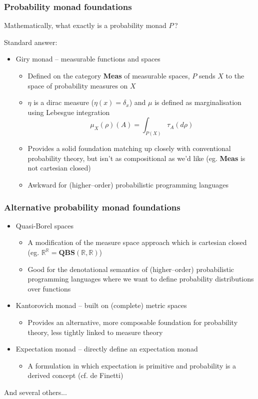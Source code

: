 \documentclass[mathserif,handout]{beamer}
\newcommand{\reals}{\mathbb{R}}
\begin{document}
\begin{frame}
  \frametitle{Probability monad foundations}
  Mathematically, what \alert{exactly} is a probability monad $P$\,?

  Standard answer:
  
  \begin{itemize}
  \item \alert{Giry monad} --  measurable functions and spaces
    \begin{itemize}
      \item Defined on the category \textbf{Meas} of measurable spaces, $P$ sends $X$ to the space of probability measures on $X$
      \item $\eta$ is a dirac measure ($\eta(x) = \delta_x$) and $\mu$ is defined as marginalisation using Lebesgue integration
        \[
\mu_X(\rho)(A) = \int_{P(X)} \tau_A(d\rho)
        \]
      \item Provides a solid foundation matching up closely with conventional probability theory, but isn't as compositional as we'd like (eg. \textbf{Meas} is not cartesian closed)
        \item Awkward for (higher--order) probabilistic programming languages
    \end{itemize}
  \end{itemize}
\end{frame}

\begin{frame}
  \frametitle{Alternative probability monad foundations}
  \begin{itemize}
\item \alert{Quasi-Borel spaces}
    \begin{itemize}
    \item A modification of the measure space approach which is cartesian closed (eg. $\reals^\reals = \mathbf{QBS}(\reals,\reals)$)
      \item Good for the denotational semantics of (higher--order) probabilistic programming languages where we want to define probability distributions over functions
    \end{itemize}
  \item \alert{Kantorovich monad} -- built on (complete) metric spaces
    \begin{itemize}
\item Provides an alternative, more composable foundation for probability theory, less tightly linked to measure theory
    \end{itemize}
  \item \alert{Expectation monad} -- directly define an expectation monad
    \begin{itemize}
      \item A formulation in which expectation is primitive and probability is a derived concept (cf. de Finetti)
    \end{itemize}
  \end{itemize}
And several others...
\end{frame}
\end{document}
